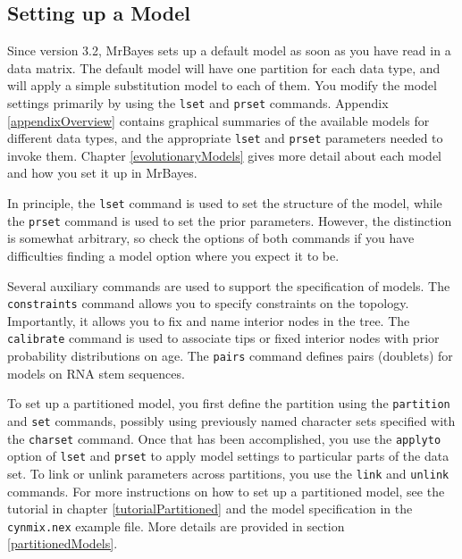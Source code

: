 \documentclass[12pt]{book}
\newcommand{\ttt}[1]{\texttt{#1} }
\begin{document}
\subsection{Setting up a Model}

Since version 3.2, MrBayes sets up a default model as soon as you have read in a data matrix. The
default model will have one partition for each data type, and will apply a simple substitution
model to each of them.  You modify the model settings primarily by using the \ttt{lset} and
\ttt{prset} commands. Appendix \ref{appendixOverview} contains graphical summaries of the available models
for different data types, and the appropriate \ttt{lset} and \ttt{prset} parameters needed to
invoke them. Chapter \ref{evolutionaryModels} gives more detail about each model and how you set it
up in MrBayes.

In principle, the \ttt{lset} command is used to set the structure of the model, while the
\ttt{prset} command is used to set the prior parameters. However, the distinction is somewhat
arbitrary, so check the options of both commands if you have difficulties finding a model option
where you expect it to be.

Several auxiliary commands are used to support the specification of models. The \ttt{constraints}
command allows you to specify constraints on the topology. Importantly, it allows you to fix and
name interior nodes in the tree.  The \ttt{calibrate} command is used to associate tips or fixed
interior nodes with prior probability distributions on age. The \ttt{pairs} command defines pairs
(doublets) for models on RNA stem sequences.

To set up a partitioned model, you first define the partition using the \ttt{partition} and
\ttt{set} commands, possibly using previously named character sets specified with the \ttt{charset}
command. Once that has been accomplished, you use the \ttt{applyto} option of \ttt{lset} and
\ttt{prset} to apply model settings to particular parts of the data set. To link or unlink
parameters across partitions, you use the \ttt{link} and \ttt{unlink} commands. For more
instructions on how to set up a partitioned model, see the tutorial in chapter
\ref{tutorialPartitioned} and the model specification in the \ttt{cynmix.nex} example file. More
details are provided in section \ref{partitionedModels}.
\end{document}
